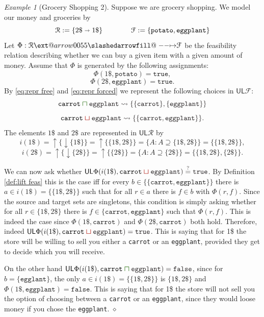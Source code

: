 \documentclass[12pt]{article}
\makeatletter
\theoremstyle{definition}
\theoremstyle{plain}
\theoremstyle{plain}
\theoremstyle{plain}
\theoremstyle{plain}
\theoremstyle{remark}
\newtheorem{example}[definition]{Example}
\newcommand\xqed[1]{%
	\leavevmode\unskip\penalty9999 \hbox{}\nobreak\hfill
	\quad\hbox{#1}}
\newcommand\exampleend{\xqed{$\diamond$}}
\theoremstyle{remark}
\newcommand{\mc}[1]{\mathcal{#1}}
\newcommand{\low}{\mathsf{L}}
\newcommand{\upper}{\mathsf{U}}
\newcommand{\true}{\mathtt{true}}
\newcommand{\false}{\mathtt{false}}
\newcommand{\upc}[1]{{\uparrow #1}}
\newcommand{\lwc}[1]{{\downarrow #1}}
\def\slashedarrowfill@#1#2#3#4#5{%
	$\m@th\thickmuskip0mu\medmuskip\thickmuskip\thinmuskip\thickmuskip
	\relax#5#1\mkern-7mu%
	\cleaders\hbox{$#5\mkern-2mu#2\mkern-2mu$}\hfill
	\mathclap{#3}\mathclap{#2}%
	\cleaders\hbox{$#5\mkern-2mu#2\mkern-2mu$}\hfill
	\mkern-7mu#4$%
}
\def\rightslashedarrowfill@{%
	\slashedarrowfill@\relbar\relbar\mapstochar\rightarrow}
\newcommand\xslashedrightarrow[2][]{%
	\ext@arrow 0055{\rightslashedarrowfill@}{#1}{#2}}
\newcommand{\csqcap}{\color{OliveGreen}\bm{\sqcap}\color{Black}}
\newcommand{\csqcup}{\color{BrickRed}\bm{\sqcup}\color{Black}}
\makeatother
\begin{document}
\begin{example}[Grocery Shopping 2]
	Suppose we are grocery shopping. We model our money and groceries by $$\mc{R} := \{2\$ \shortrightarrow 1\$\} \qquad \qquad \mc{F} := \{\mathtt{potato}, \mathtt{eggplant} \}$$
	Let $\Phi: \mc{R} \xslashedrightarrow{} \mc{F}$ be the feasibility relation describing whether we can buy a given item with a given amount of money. Assume that $\Phi$ is generated by the following assignments:
	$$\Phi(1\$,\mathtt{potato}) = \true,$$
	$$\Phi(2\$,\mathtt{eggplant}) = \true.$$
	By \eqref{eq:repr free} and \eqref{eq:repr forced} we represent the following choices in $\upper\low\mc{F}$:
	$$\mathtt{carrot} \csqcap \mathtt{eggplant} \rightsquigarrow \{ \{\mathtt{carrot}\},\{\mathtt{eggplant}\} \}$$ 
	$$\mathtt{carrot} \csqcup \mathtt{eggplant} \rightsquigarrow \{ \{ \mathtt{carrot}, \mathtt{eggplant} \} \}.$$
	The elements $1\$$ and $2\$$ are represented in $\upper\low\mc{R}$ by
	$$i(1\$) = \upc\{\lwc\{ 1\$ \} \} = \upc \{ \{1\$, 2\$\} \} = \{A : A \supseteq \{1\$, 2\$ \} \} = \{ \{ 1\$,2\$\} \},$$
	$$i(2\$) = \upc\{\lwc\{ 2\$ \} \} = \upc \{ \{2\$\} \} = \{A : A \supseteq  \{2\$\} \} = \{ \{1\$, 2\$ \}, \{2\$\}  \}.$$
	
	We can now ask whether $\upper\low\Phi(i(1\$), \mathtt{carrot} \csqcup \mathtt{eggplant}) \stackrel{?}{=} \true$. By Definition \ref{def:lift feas} this is the case iff for every $b \in \{ \{ \mathtt{carrot}, \mathtt{eggplant} \} \}$ there is $a \in i(1\$) = \{ \{ 1\$,2\$\} \}$ such that for all $r \in a$ there is $f \in b$ with $\Phi(r,f)$. Since the source and target sets are singletons, this condition is simply asking whether for all $r \in \{ 1\$, 2\$ \}$ there is $f \in \{ \mathtt{carrot}, \mathtt{eggplant} \}$ such that $\Phi(r,f)$. This is indeed the case since $\Phi(1\$,\mathtt{carrot})$ and $\Phi(2\$,\mathtt{carrot})$ both hold. Therefore, indeed $\upper\low\Phi(i(1\$), \mathtt{carrot} \csqcup \mathtt{eggplant}) = \true$. This is saying that for 1\$ the store will be willing to sell you either a \texttt{carrot} or an \texttt{eggplant}, provided they get to decide which you will receive.
	
	On the other hand $\upper\low\Phi(i(1\$), \mathtt{carrot} \csqcap \mathtt{eggplant}) = \false$, since for $b = \{\mathtt{egglant}\}$, the only $a \in i(1\$) = \{ \{ 1\$,2\$\} \}$ is $\{1\$, 2\$ \}$ and  $\Phi(1\$,\mathtt{eggplant}) = \false$. This is saying that for 1\$ the store will not sell you the option of choosing between a \texttt{carrot} or an \texttt{eggplant}, since they would loose money if you chose the \texttt{eggplant}. \exampleend
\end{example}
\end{document}
